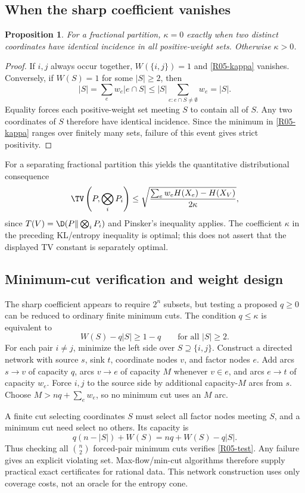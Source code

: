 \documentclass[11pt,a4paper]{article}
\newtheorem{proposition}[theorem]{Proposition}
\theoremstyle{definition}\newtheorem{definition}[theorem]{Definition}
\theoremstyle{remark}\newtheorem{remark}[theorem]{Remark}
\numberwithin{equation}{section}
\begin{document}
\subsection{When the sharp coefficient vanishes}\label{R05-sec-4}
\begin{proposition}\label{R05-separation}
For a fractional partition, $\kappa=0$ exactly when two distinct coordinates have identical incidence in all positive-weight sets. Otherwise $\kappa>0$.
\end{proposition}
\begin{proof}
If $i,j$ always occur together, $W(\{i,j\})=1$ and \eqref{R05-kappa} vanishes. Conversely, if $W(S)=1$ for some $|S|\geq2$, then
\[
|S|=\sum_e w_e|e\cap S|\leq|S|\sum_{e:e\cap S\ne\emptyset}w_e=|S|.
\]
Equality forces each positive-weight set meeting $S$ to contain all of $S$. Any two coordinates of $S$ therefore have identical incidence. Since the minimum in \eqref{R05-kappa} ranges over finitely many sets, failure of this event gives strict positivity.
\end{proof}
For a separating fractional partition this yields the quantitative distributional consequence
\[
\TV\left(P,\bigotimes_iP_i\right)
\leq\sqrt{\frac{\sum_e w_eH(X_e)-H(X_V)}{2\kappa}},
\]
since $T(V)=\D(P\Vert\bigotimes_iP_i)$ and Pinsker's inequality applies. The coefficient $\kappa$ in the preceding KL/entropy inequality is optimal; this does not assert that the displayed TV constant is separately optimal.

\subsection{Minimum-cut verification and weight design}\label{R05-sec-5}
The sharp coefficient appears to require $2^n$ subsets, but testing a proposed $q\geq0$ can be reduced to ordinary finite minimum cuts. The condition $q\leq\kappa$ is equivalent to
\begin{equation}\label{R05-test}
W(S)-q|S|\geq1-q\qquad\text{for all }|S|\geq2.
\end{equation}
For each pair $i\ne j$, minimize the left side over $S\supseteq\{i,j\}$. Construct a directed network with source $s$, sink $t$, coordinate nodes $v$, and factor nodes $e$. Add arcs $s\to v$ of capacity $q$, arcs $v\to e$ of capacity $M$ whenever $v\in e$, and arcs $e\to t$ of capacity $w_e$. Force $i,j$ to the source side by additional capacity-$M$ arcs from $s$. Choose
$M>nq+\sum_ew_e$, so no minimum cut uses an $M$ arc.

A finite cut selecting coordinates $S$ must select all factor nodes meeting $S$, and a minimum cut need select no others. Its capacity is
\[
q(n-|S|)+W(S)=nq+W(S)-q|S|.
\]
Thus checking all $\binom n2$ forced-pair minimum cuts verifies \eqref{R05-test}. Any failure gives an explicit violating set. Max-flow/min-cut algorithms therefore supply practical exact certificates for rational data. This network construction uses only coverage costs, not an oracle for the entropy cone.
\end{document}

